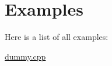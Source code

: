 \section{Examples}
Here is a list of all examples\+:\begin{DoxyCompactItemize}
\item 
\mbox{\hyperlink{dummy_8cpp-example}{dummy.\+cpp}}
\end{DoxyCompactItemize}
